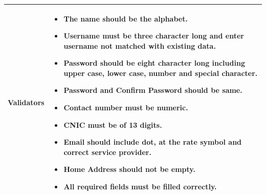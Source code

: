 \documentclass[12pt,a4paper]{article}
\begin{document}
\begin{longtable}{| p{3cm}|p{12cm}|}
Validators & 
\begin{itemize}
\item  The name should be the alphabet.
\item  Username must be three character long and enter username not matched with existing data.
\item Password should be eight character long including upper case, lower case, number and special character.

\item  Password and Confirm Password should be same.
\item  Contact number must be numeric. 
\item  CNIC must be of 13 digits.
\item  Email should include dot, at the rate symbol and correct service provider.
\item Home Address should not be empty. 
\item All required fields must be filled correctly. 
\end{itemize}
\\ \hline

\end{longtable} 
\end{document}
